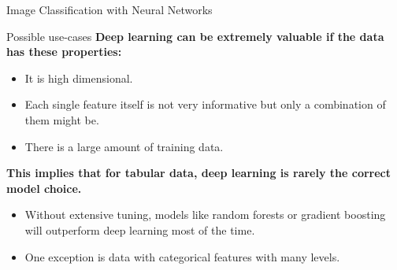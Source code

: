 \documentclass[11pt,compress,t,notes=noshow, xcolor=table]{beamer}
\begin{document}
\begin{frame}{Image Classification with Neural Networks}
\begin{overlayarea}{\textwidth}{\textheight}
\end{overlayarea}
\end{frame}

\begin{frame} {Possible use-cases}
\textbf{Deep learning can be extremely valuable if the data has these properties:}
\vspace{.2cm}
\begin{itemize}
\item It is high dimensional.
\item Each single feature itself is not very informative but only a combination of them might be.
\item There is a large amount of training data.
\end{itemize}
\vspace{.7cm}
\textbf{This implies that for tabular data, deep learning is rarely the correct model choice.}
\vspace{.2cm}
\begin{itemize}
\item Without extensive tuning, models like random forests or gradient boosting will outperform deep learning most of the time.
\item One exception is data with categorical features with many levels.
\end{itemize}

\end{frame}
\end{document}
